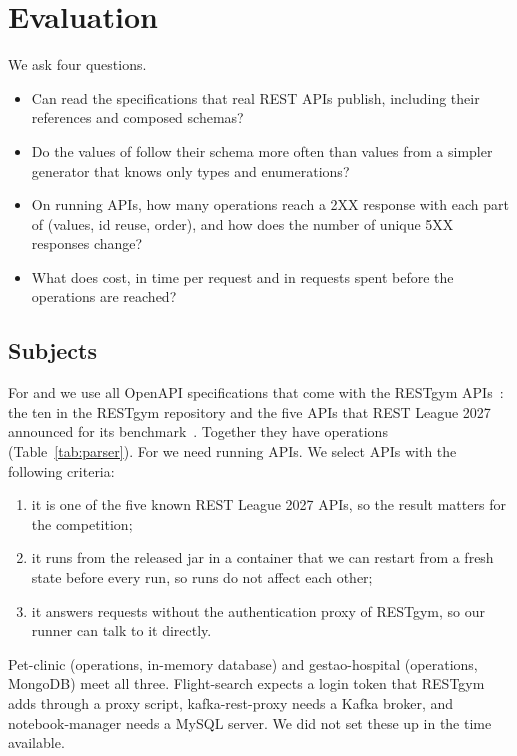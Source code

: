 \section{Evaluation}
\label{sec:eval}

We ask four questions.
\begin{itemize}
  \item[\rqref{1}] Can \tool read the specifications that real REST APIs
    publish, including their references and composed schemas?
  \item[\rqref{2}] Do the  values of \tool follow their schema
    more often than values from a simpler generator that knows only types and
    enumerations?
  \item[\rqref{3}] On running APIs, how many operations reach a 2XX response
    with each part of \tool (values, id reuse, order), and how does the
    number of unique 5XX responses change?
  \item[\rqref{4}] What does \tool cost, in time per request and in
    requests spent before the operations are reached?
\end{itemize}

\subsection{Subjects}
\label{sec:subjects}
For  and  we use all \NSpecs OpenAPI specifications that
come with the RESTgym APIs~\cite{restgym}: the ten in the RESTgym
repository and the five APIs that REST League 2027 announced for its
benchmark~\cite{restleague}. Together they have \NOpsTotal operations
(Table~\ref{tab:parser}). For  we need running APIs. We select
APIs with the following criteria:
\begin{enumerate}
  \item it is one of the five known REST League 2027 APIs, so the result
    matters for the competition;
  \item it runs from the released jar in a container that we can restart
    from a fresh state before every run, so runs do not affect each other;
  \item it answers requests without the authentication proxy of RESTgym, so
    our runner can talk to it directly.
\end{enumerate}
Pet-clinic (\NPetclinicOps operations, in-memory database) and
gestao-hospital (\NGestaohospitalOps operations, MongoDB) meet all three.
Flight-search expects a login token that RESTgym adds through a proxy
script, kafka-rest-proxy needs a Kafka broker, and notebook-manager needs a
MySQL server. We did not set these up in the time available.

